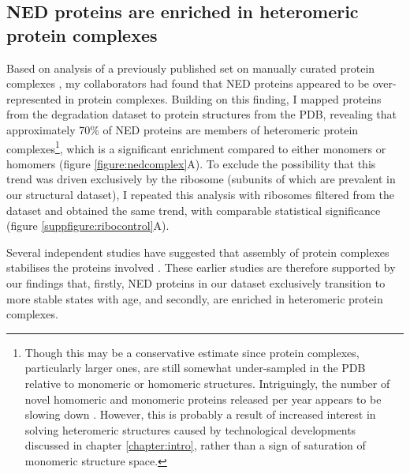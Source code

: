 \documentclass[a4paper,11pt,twoside,openright]{scrbook}
\begin{document}
\subsection{NED proteins are enriched in heteromeric protein complexes}
Based on analysis of a previously published set on manually curated protein complexes \cite{Ori2016}, my collaborators had found that NED proteins appeared to be over-represented in protein complexes. Building on this finding, I mapped proteins from the degradation dataset to protein structures from the PDB, revealing that approximately 70\% of NED proteins are members of heteromeric protein complexes\footnote{Though this may be a conservative estimate since protein complexes, particularly larger ones, are still somewhat under-sampled in the PDB relative to monomeric or homomeric structures. Intriguingly, the number of novel homomeric and monomeric proteins released per year appears to be slowing down \cite{Perica2012a,Marsh2014}. However, this is probably a result of increased interest in solving heteromeric structures caused by technological developments discussed in chapter \ref{chapter:intro}, rather than a sign of saturation of monomeric structure space.}, which is a significant enrichment compared to either monomers or homomers (figure \ref{figure:nedcomplex}A). To exclude the possibility that this trend was driven exclusively by the ribosome (subunits of which are prevalent in our structural dataset), I repeated this analysis with ribosomes filtered from the dataset and obtained the same trend, with comparable statistical significance (figure \ref{suppfigure:ribocontrol}A).

Several independent studies have suggested that assembly of protein complexes stabilises the proteins involved \cite{Goldberg2003,Malinverni2006,Toyama2013}. These earlier studies are therefore supported by our findings that, firstly, NED proteins in our dataset exclusively transition to more stable states with age, and secondly, are enriched in heteromeric protein complexes.

\end{document}

